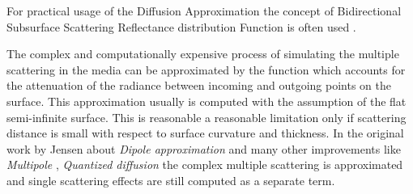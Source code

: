 For practical usage of the Diffusion Approximation the concept of Bidirectional Subsurface
Scattering Reflectance distribution Function is often used \cite{Jensen:2001:PMS:383259.383319}.

The complex and computationally expensive process of simulating the multiple scattering in the media
can be approximated by the function which accounts for the attenuation of the radiance between
incoming and outgoing points on the surface. This approximation usually is computed with the
assumption of the flat semi-infinite surface. This is reasonable a reasonable limitation only if
scattering distance is small with respect to surface curvature and thickness. In the original work
by Jensen \cite{Jensen:2001:PMS:383259.383319} about \emph{Dipole approximation} and many other
improvements like \emph{Multipole} \cite{Donner:2005:LDM:1186822.1073308}, \emph{Quantized
diffusion} \cite{D'Eon:2011:QMR:1964921.1964951} the complex multiple scattering is approximated and
single scattering effects are still computed as a separate term.
